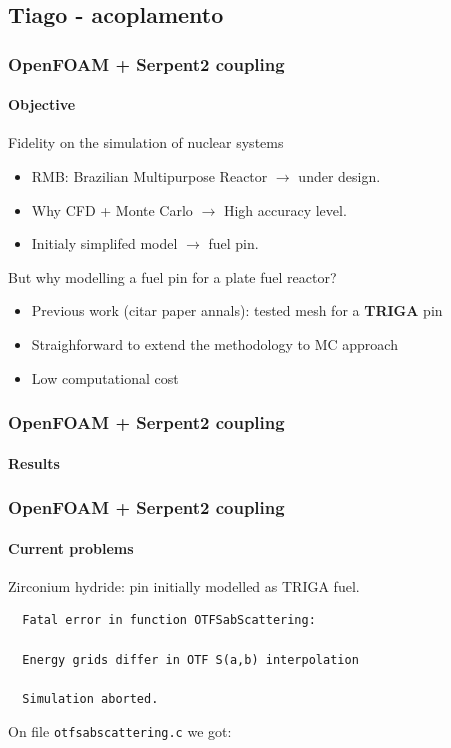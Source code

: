 \documentclass[svgnames,smaller,table]{beamer}
\begin{document}
\subsection{Tiago - acoplamento}
\begin{frame}
  \frametitle{OpenFOAM + Serpent2 coupling}
  \framesubtitle{Objective}
  \begin{center}
    Fidelity on the simulation of nuclear systems\\
    \vspace{10px}
    \begin{itemize}
    \item RMB: Brazilian Multipurpose Reactor $\rightarrow$ under design.
    \item Why CFD + Monte Carlo $\rightarrow$ High accuracy level.
    \item Initialy simplifed model $\rightarrow$ fuel pin.
    \end{itemize}
    But why modelling a fuel pin for a plate fuel reactor?
    \begin{itemize}
    \item Previous work (citar paper annals): tested mesh for a \textbf{TRIGA} pin
    \item Straighforward to extend the methodology to MC approach
    \item Low computational cost
    \end{itemize}
  \end{center}
\end{frame}

\begin{frame}
  \frametitle{OpenFOAM + Serpent2 coupling}
  \framesubtitle{Results}
  \begin{center}
    
  \end{center}
\end{frame}

\begin{frame}[fragile] %
  \frametitle{OpenFOAM + Serpent2 coupling}
  \framesubtitle{Current problems}
  \begin{center}
  Zirconium hydride: pin initially modelled as TRIGA fuel.\\
\begin{verbatim}
  Fatal error in function OTFSabScattering:

  Energy grids differ in OTF S(a,b) interpolation

  Simulation aborted.
\end{verbatim}

On file \texttt{otfsabscattering.c} we got:

  
  \end{center}
\end{frame}
\end{document}
